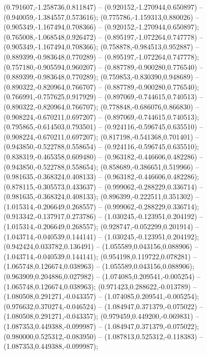  (0.791607,-1.258736,0.811847) -- (0.920152,-1.270944,0.650897) -- (0.940059,-1.384557,0.573616);
 (0.775786,-1.159313,0.880026) -- (0.905349,-1.167494,0.708366) -- (0.920152,-1.270944,0.650897);
 (0.765008,-1.068548,0.926472) -- (0.895197,-1.072264,0.747778) -- (0.905349,-1.167494,0.708366);
 (0.758878,-0.984513,0.952887) -- (0.889399,-0.983648,0.770289) -- (0.895197,-1.072264,0.747778);
 (0.757180,-0.905594,0.960207) -- (0.887789,-0.900280,0.776540) -- (0.889399,-0.983648,0.770289);
 (0.759853,-0.830390,0.948689) -- (0.890322,-0.820964,0.766707) -- (0.887789,-0.900280,0.776540);
 (0.766991,-0.757625,0.917929) -- (0.897069,-0.744615,0.740513) -- (0.890322,-0.820964,0.766707);
 (0.778848,-0.686076,0.866830) -- (0.908224,-0.670211,0.697207) -- (0.897069,-0.744615,0.740513);
 (0.795865,-0.614503,0.793501) -- (0.924116,-0.596745,0.635510) -- (0.908224,-0.670211,0.697207);
 (0.817198,-0.541368,0.701401) -- (0.943850,-0.522788,0.558654) -- (0.924116,-0.596745,0.635510);
 (0.838319,-0.465358,0.609480) -- (0.963182,-0.446606,0.482286) -- (0.943850,-0.522788,0.558654);
 (0.858689,-0.386651,0.519966) -- (0.981635,-0.368324,0.408133) -- (0.963182,-0.446606,0.482286);
 (0.878115,-0.305573,0.433637) -- (0.999062,-0.288229,0.336714) -- (0.981635,-0.368324,0.408133);
 (0.896399,-0.222511,0.351302) -- (1.015314,-0.206649,0.268557) -- (0.999062,-0.288229,0.336714);
 (0.913342,-0.137917,0.273786) -- (1.030245,-0.123951,0.204192) -- (1.015314,-0.206649,0.268557);
 (0.928747,-0.052299,0.201914) -- (1.043714,-0.040539,0.144141) -- (1.030245,-0.123951,0.204192);
 (0.942424,0.033782,0.136491) -- (1.055589,0.043156,0.088906) -- (1.043714,-0.040539,0.144141);
 (0.954198,0.119722,0.078281) -- (1.065748,0.126674,0.038963) -- (1.055589,0.043156,0.088906);
 (0.963909,0.204886,0.027982) -- (1.074085,0.209541,-0.005254) -- (1.065748,0.126674,0.038963);
 (0.971423,0.288622,-0.013789) -- (1.080508,0.291271,-0.043357) -- (1.074085,0.209541,-0.005254);
 (0.976632,0.370274,-0.046524) -- (1.084947,0.371379,-0.075022) -- (1.080508,0.291271,-0.043357);
 (0.979459,0.449200,-0.069831) -- (1.087353,0.449388,-0.099987) -- (1.084947,0.371379,-0.075022);
 (0.980000,0.525312,-0.083950) -- (1.087813,0.525312,-0.118383) -- (1.087353,0.449388,-0.099987);
